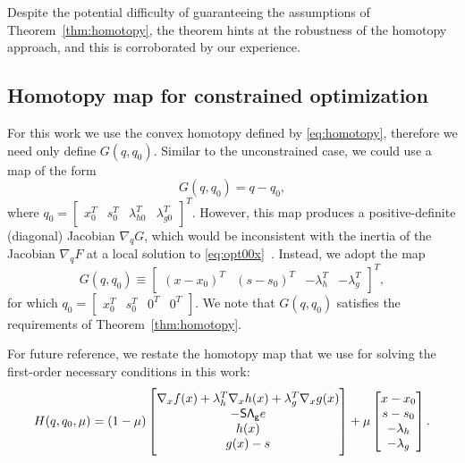 Despite the potential difficulty of guaranteeing the assumptions of
Theorem~\ref{thm:homotopy}, the theorem hints at the robustness of the homotopy
approach, and this is corroborated by our experience.

\subsection{Homotopy map for constrained optimization}\label{sec:map}

For this work we use the convex homotopy defined by \eqref{eq:homotopy},
therefore we need only define $G(q,q_0)$.  Similar to the unconstrained case, we
could use a map of the form
\begin{equation*}
  G(q,q_0) = q - q_0,
\end{equation*}
where $q_0 = \begin{bmatrix} x_0^T & s_0^T & \lambda_{h0}^T &  \lambda_{g0}^T \end{bmatrix}^T$.  However, this map produces a
positive-definite (diagonal) Jacobian $\nabla_q G$, which would be inconsistent
with the inertia of the Jacobian $\nabla_q F$ at a local solution to
\eqref{eq:opt00x}~\cite{Nocedal2006NO}.  Instead, we adopt the map
\begin{equation*}
  G(q,q_0) \equiv \begin{bmatrix}
    (x - x_0)^T &
    (s - s_0)^T &
    -\lambda_h^T & 
    -\lambda_g^T
  \end{bmatrix}^T, 
\end{equation*}
for which $q_0 = \begin{bmatrix} x_0^T & s_0^T & 0^T & 0^T \end{bmatrix}$.
We note that $G(q,q_0)$ satisfies the requirements of
Theorem~\ref{thm:homotopy}. 

For future reference, we restate the homotopy map that we use for solving the
first-order necessary conditions in this work:
\begin{equation}\label{eq:homo0}
    H(q, q_0, \mu) = (1-\mu)
    \begin{bmatrix}
      \nabla_x f(x) +   \lambda_h^T \nabla_x h(x)  +  \lambda_g^T \nabla_x g(x) \\
      -\mathsf{S}\mathsf{\Lambda_g} e \\
      h(x) \\
      g(x) - s 
    \end{bmatrix}
    + \mu
    \begin{bmatrix}
      x - x_0 \\
      s - s_0 \\
      -\lambda_h \\
      -\lambda_g
    \end{bmatrix}.
\end{equation}

